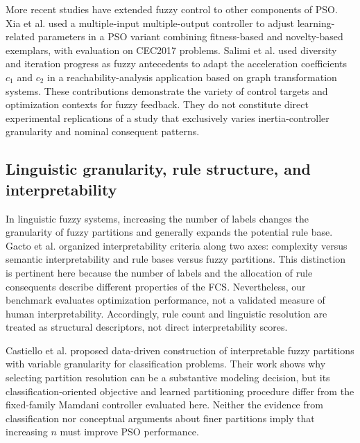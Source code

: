 More recent studies have extended fuzzy control to other components of PSO. Xia et al. \cite{Xia2023} used a multiple-input multiple-output controller to adjust learning-related parameters in a PSO variant combining fitness-based and novelty-based exemplars, with evaluation on CEC2017 problems. Salimi et al. \cite{Salimi2025} used diversity and iteration progress as fuzzy antecedents to adapt the acceleration coefficients $c_1$ and $c_2$ in a reachability-analysis application based on graph transformation systems. These contributions demonstrate the variety of control targets and optimization contexts for fuzzy feedback. They do not constitute direct experimental replications of a study that exclusively varies inertia-controller granularity and nominal consequent patterns.

\subsection{Linguistic granularity, rule structure, and interpretability}
In linguistic fuzzy systems, increasing the number of labels changes the granularity of fuzzy partitions and generally expands the potential rule base. Gacto et al. \cite{Gacto2011} organized interpretability criteria along two axes: complexity versus semantic interpretability and rule bases versus fuzzy partitions. This distinction is pertinent here because the number of labels and the allocation of rule consequents describe different properties of the FCS. Nevertheless, our benchmark evaluates optimization performance, not a validated measure of human interpretability. Accordingly, rule count and linguistic resolution are treated as structural descriptors, not direct interpretability scores.

Castiello et al. \cite{Castiello2019} proposed data-driven construction of interpretable fuzzy partitions with variable granularity for classification problems. Their work shows why selecting partition resolution can be a substantive modeling decision, but its classification-oriented objective and learned partitioning procedure differ from the fixed-family Mamdani controller evaluated here. Neither the evidence from classification nor conceptual arguments about finer partitions imply that increasing $n$ must improve PSO performance.

